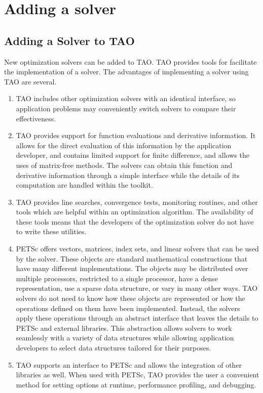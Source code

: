 
\chapter{Adding a solver}
\label{chapter:addsolver}

\section{Adding a Solver to TAO}

New optimization solvers can be added to TAO.  TAO provides tools for
facilitate the implementation of a solver.  The advantages of implementing
a solver using TAO are several.

\begin{enumerate}
\item TAO includes other optimization solvers with an identical interface, 
so application problems may
conveniently switch solvers to compare their effectiveness.

\item TAO provides support for function evaluations and
derivative information.  It allows for the direct evaluation
of this information by the application developer, 
and contains limited support for finite difference, and
allows the uses of matrix-free methods.
The solvers can obtain this function and derivative information
through a simple interface  while the details of its computation 
are handled within the toolkit.

\item TAO provides line searches, convergence
tests, monitoring routines, and other tools
which are helpful within an optimization algorithm.
The availability
of these tools means that the developers of the optimization
solver do not have to write these utilities.

\item PETSc offers vectors, matrices, index sets, and linear solvers
that can be used by the solver.  These objects are standard mathematical
constructions that have many different implementations.
The objects may be distributed over multiple processors, restricted to
a single processor, have a dense representation, 
use a sparse data structure, or vary in many other ways.  
TAO solvers do not need to know how
these objects are represented or how the operations defined on them
have been implemented.  Instead, the solvers apply these operations
through an abstract interface that leaves the details to PETSc
and external libraries.
This abstraction allows solvers to work seamlessly with a variety
of data structures while allowing application developers to select 
data structures tailored for their purposes.

\item TAO supports an interface to PETSc and
allows the integration of other libraries as well.
When used with PETSc, TAO provides the user a convenient
method for setting options at runtime, performance profiling, and debugging.

\end{enumerate}

